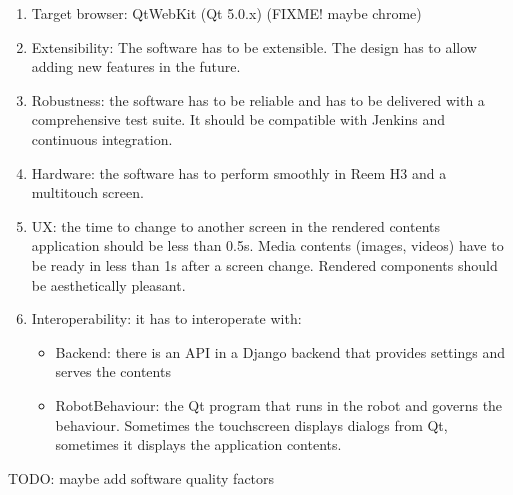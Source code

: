 \begin{enumerate}
    \item Target browser: QtWebKit (Qt 5.0.x) (FIXME! maybe chrome)
    \item Extensibility: The software has to be extensible. The design has to allow adding new features in the future.
    \item Robustness: the software has to be reliable and has to be delivered with a comprehensive test suite. It should be compatible with Jenkins and continuous integration.
    \item Hardware: the software has to perform smoothly in Reem H3 and a multitouch screen.
    \item \ac{UX}: the time to change to another screen in the rendered contents application should be less than 0.5s. Media contents (images, videos) have to be ready in less than 1s after a screen change. Rendered components should be aesthetically pleasant.
    \item Interoperability: it has to interoperate with:
    \begin{itemize}
        \item Backend: there is an \ac{API} in a Django backend that provides settings and serves the contents
        \item RobotBehaviour: the Qt program that runs in the robot and governs the behaviour. Sometimes the touchscreen displays dialogs from Qt, sometimes it displays the application contents. 
    \end{itemize}
\end{enumerate}

TODO: maybe add software quality factors